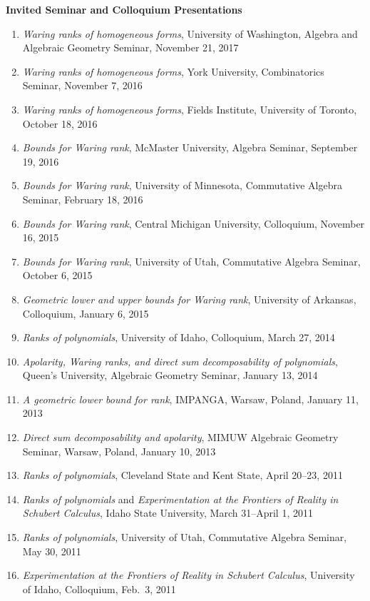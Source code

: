 \documentclass[12pt]{article}
\begin{document}
\textbf{Invited Seminar and Colloquium Presentations}
\begin{enumerate}[revarabic]
\item \textit{Waring ranks of homogeneous forms}, University of Washington, Algebra and Algebraic Geometry Seminar, November 21, 2017
\item \textit{Waring ranks of homogeneous forms}, York University, Combinatorics Seminar, November 7, 2016
\item \textit{Waring ranks of homogeneous forms}, Fields Institute, University of Toronto, October 18, 2016
\item \textit{Bounds for Waring rank}, McMaster University, Algebra Seminar, September 19, 2016
\item \textit{Bounds for Waring rank}, University of Minnesota, Commutative Algebra Seminar, February 18, 2016
\item \textit{Bounds for Waring rank}, Central Michigan University, Colloquium, November 16, 2015
\item \textit{Bounds for Waring rank}, University of Utah, Commutative Algebra Seminar, October 6, 2015
\item \textit{Geometric lower and upper bounds for Waring rank}, University of Arkansas, Colloquium, January 6, 2015
\item \textit{Ranks of polynomials}, University of Idaho, Colloquium, March 27, 2014
\item \textit{Apolarity, Waring ranks, and direct sum decomposability of polynomials}, Queen's University, Algebraic Geometry Seminar, January 13, 2014
\item \textit{A geometric lower bound for rank}, IMPANGA, Warsaw, Poland, January 11, 2013
\item \textit{Direct sum decomposability and apolarity}, MIMUW Algebraic Geometry Seminar, Warsaw, Poland, January 10, 2013
\item \textit{Ranks of polynomials}, Cleveland State and Kent State, April 20--23, 2011
\item \textit{Ranks of polynomials} and \textit{Experimentation at the Frontiers of Reality in Schubert Calculus}, Idaho State University, March 31--April 1, 2011
\item \textit{Ranks of polynomials}, University of Utah, Commutative Algebra Seminar, May 30, 2011
\item \textit{Experimentation at the Frontiers of Reality in Schubert Calculus}, University of Idaho, Colloquium, Feb.\ 3, 2011


\end{enumerate}
\end{document}
